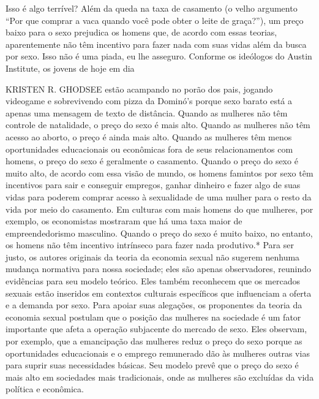  \par 
Isso é algo terrível? Além da queda na taxa de casamento (o velho argumento “Por que comprar a vaca quando você pode obter o leite de graça?”), um preço baixo para o sexo prejudica os homens que, de acordo com essas teorias, aparentemente não têm incentivo para fazer nada com suas vidas além da busca por sexo. Isso não é uma piada, eu lhe asseguro. Conforme os ideólogos do Austin Institute, os jovens de hoje em dia
 \par 
KRISTEN R. GHODSEE estão acampando no porão dos pais, jogando videogame e sobrevivendo com pizza da Dominó's porque sexo barato está a apenas uma mensagem de texto de distância. Quando as mulheres não têm controle de natalidade, o preço do sexo é mais alto. Quando as mulheres não têm acesso ao aborto, o preço é ainda mais alto. Quando as mulheres têm menos oportunidades educacionais ou econômicas fora de seus relacionamentos com homens, o preço do sexo é geralmente o casamento. Quando o preço do sexo é muito alto, de acordo com essa visão de mundo, os homens famintos por sexo têm incentivos para sair e conseguir empregos, ganhar dinheiro e fazer algo de suas vidas para poderem comprar acesso à sexualidade de uma mulher para o resto da vida por meio do casamento. Em culturas com mais homens do que mulheres, por exemplo, os economistas mostraram que há uma taxa maior de empreendedorismo masculino. Quando o preço do sexo é muito baixo, no entanto, os homens não têm incentivo intrínseco para fazer nada produtivo.* Para ser justo, os autores originais da teoria da economia sexual não sugerem nenhuma mudança normativa para nossa sociedade; eles são apenas observadores, reunindo evidências para seu modelo teórico. Eles também reconhecem que os mercados sexuais estão inseridos em contextos culturais específicos que influenciam a oferta e a demanda por sexo. Para apoiar suas alegações, os proponentes da teoria da economia sexual postulam que o posição das mulheres na sociedade é um fator importante que afeta a operação subjacente do mercado de sexo. Eles observam, por exemplo, que a emancipação das mulheres reduz o preço do sexo porque as oportunidades educacionais e o emprego remunerado dão às mulheres outras vias para suprir suas necessidades básicas. Seu modelo prevê que o preço do sexo é mais alto em sociedades mais tradicionais, onde as mulheres são excluídas da vida política e econômica.
 \par 
